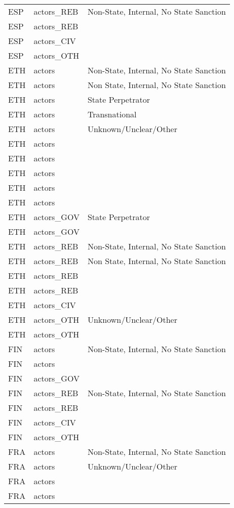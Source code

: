 \begin{table}[ht]
\begin{tabular}{lll}
  ESP & actors\_REB & Non-State, Internal, No State Sanction \\ 
  ESP & actors\_REB &  \\ 
  ESP & actors\_CIV &  \\ 
  ESP & actors\_OTH &  \\ 
  ETH & actors & Non-State, Internal, No State Sanction \\ 
  ETH & actors & Non State, Internal, No State Sanction \\ 
  ETH & actors & State Perpetrator \\ 
  ETH & actors & Transnational \\ 
  ETH & actors & Unknown/Unclear/Other \\ 
  ETH & actors &  \\ 
  ETH & actors &  \\ 
  ETH & actors &  \\ 
  ETH & actors &  \\ 
  ETH & actors &  \\ 
  ETH & actors\_GOV & State Perpetrator \\ 
  ETH & actors\_GOV &  \\ 
  ETH & actors\_REB & Non-State, Internal, No State Sanction \\ 
  ETH & actors\_REB & Non State, Internal, No State Sanction \\ 
  ETH & actors\_REB &  \\ 
  ETH & actors\_REB &  \\ 
  ETH & actors\_CIV &  \\ 
  ETH & actors\_OTH & Unknown/Unclear/Other \\ 
  ETH & actors\_OTH &  \\ 
  FIN & actors & Non-State, Internal, No State Sanction \\ 
  FIN & actors &  \\ 
  FIN & actors\_GOV &  \\ 
  FIN & actors\_REB & Non-State, Internal, No State Sanction \\ 
  FIN & actors\_REB &  \\ 
  FIN & actors\_CIV &  \\ 
  FIN & actors\_OTH &  \\ 
  FRA & actors & Non-State, Internal, No State Sanction \\ 
  FRA & actors & Unknown/Unclear/Other \\ 
  FRA & actors &  \\ 
  FRA & actors &  \\ 

\end{tabular}
\end{table}
